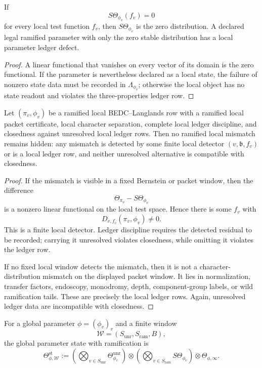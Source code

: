 \begin{corollary}
\label{cor:unified-reality-zero-local-state-ledger-row}
If
$$
S\Theta_{\phi_v}(f_v)=0
$$
for every local test function $f_v$, then $S\Theta_{\phi_v}$ is the zero
distribution. A declared legal ramified parameter with only the zero
stable distribution has a local parameter ledger defect.
\end{corollary}
\begin{proof}
A linear functional that vanishes on every vector of its domain is the
zero functional. If the parameter is nevertheless declared as a local
state, the failure of nonzero state data must be recorded in
$\Lambda_{\phi_v}$; otherwise the local object has no state readout and
violates the three-properties ledger row.
\end{proof}

\begin{theorem}
\label{thm:unified-reality-ramified-local-no-hidden-residual}
Let $(\pi_v,\phi_v)$ be a ramified local BEDC--Langlands row with a
ramified local packet certificate, local character separation, complete
local ledger discipline, and closedness against unresolved local ledger
rows. Then no ramified local mismatch remains hidden: any mismatch is
detected by some finite local detector $(v,\mathfrak b,f_v)$ or is a
local ledger row, and neither unresolved alternative is compatible with
closedness.
\end{theorem}
\begin{proof}
If the mismatch is visible in a fixed Bernstein or packet window, then
the difference
$$
\Theta_{\pi_v}-S\Theta_{\phi_v}
$$
is a nonzero linear functional on the local test space. Hence there is
some $f_v$ with
$$
D_{v,f_v}(\pi_v,\phi_v)\ne0.
$$
This is a finite local detector. Ledger discipline requires the
detected residual to be recorded; carrying it unresolved violates
closedness, while omitting it violates the ledger row.

If no fixed local window detects the mismatch, then it is not a
character-distribution mismatch on the displayed packet window. It lies
in normalization, transfer factors, endoscopy, monodromy, depth,
component-group labels, or wild ramification tails. These are precisely
the local ledger rows. Again, unresolved ledger data are incompatible
with closedness.
\end{proof}

\begin{definition}
\label{def:unified-reality-ramified-global-parameter-state}
For a global parameter $\phi=(\phi_v)_v$ and a finite window
$$
\mathcal W=(S_{\mathrm{unr}},S_{\mathrm{ram}},B),
$$
the global parameter state with ramification is
$$
\Theta_{\phi,\mathcal W}^{\mathrm{st}}
:=
\left(\bigotimes_{v\in S_{\mathrm{unr}}}
\Theta_{\phi_v}^{\mathrm{unr}}\right)
\otimes
\left(\bigotimes_{v\in S_{\mathrm{ram}}}
S\Theta_{\phi_v}\right)
\otimes
\Theta_{\phi,\infty}.
$$
\end{definition}

